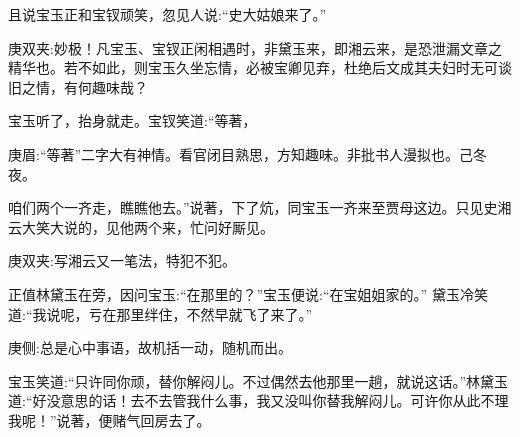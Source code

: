 \begin{parag}
    且说宝玉正和宝钗顽笑，忽见人说:“史大姑娘来了。”\begin{note}庚双夹:妙极！凡宝玉、宝钗正闲相遇时，非黛玉来，即湘云来，是恐泄漏文章之精华也。若不如此，则宝玉久坐忘情，必被宝卿见弃，杜绝后文成其夫妇时无可谈旧之情，有何趣味哉？\end{note}宝玉听了，抬身就走。宝钗笑道:“等著，\begin{note}庚眉:“等著”二字大有神情。看官闭目熟思，方知趣味。非批书人漫拟也。己冬夜。\end{note}咱们两个一齐走，瞧瞧他去。”说著，下了炕，同宝玉一齐来至贾母这边。只见史湘云大笑大说的，见他两个来，忙问好厮见。\begin{note}庚双夹:写湘云又一笔法，特犯不犯。\end{note}正值林黛玉在旁，因问宝玉:“在那里的？”宝玉便说:“在宝姐姐家的。” 黛玉冷笑道:“我说呢，亏在那里绊住，不然早就飞了来了。”\begin{note}庚侧:总是心中事语，故机括一动，随机而出。\end{note}宝玉笑道:“只许同你顽，替你解闷儿。不过偶然去他那里一趟，就说这话。”林黛玉道:“好没意思的话！去不去管我什么事，我又没叫你替我解闷儿。可许你从此不理我呢！”说著，便赌气回房去了。
\end{parag}


